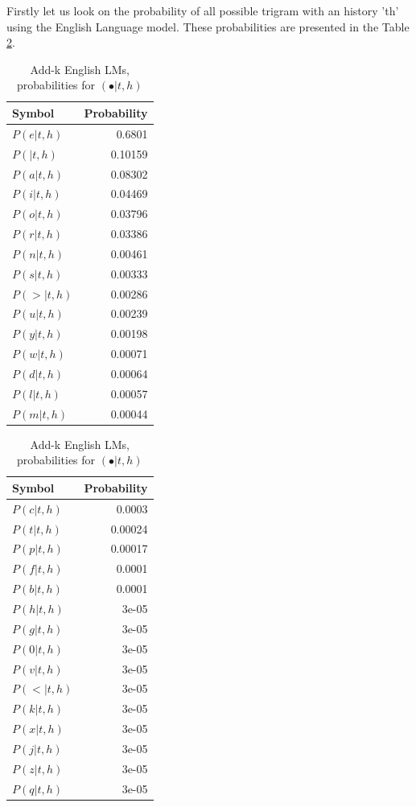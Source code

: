 Firstly let us look on the probability of all possible trigram with an history 'th' using the English Language model. These probabilities are presented in the Table \ref{tab:add-alpha-smoothing}.
\begin{table}[h]
	\centering
	\begin{minipage}{0.48\linewidth}
	\begin{tabular}{lr}
	\toprule
	Symbol & Probability \\
	\midrule
	$P(e|t,h)$ & 0.6801 \\
	$P( |t,h)$ & 0.10159 \\
	$P(a|t,h)$ & 0.08302 \\
	$P(i|t,h)$ & 0.04469 \\
	$P(o|t,h)$ & 0.03796 \\
	$P(r|t,h)$ & 0.03386 \\
	$P(n|t,h)$ & 0.00461 \\
	$P(s|t,h)$ & 0.00333 \\
	$P(>|t,h)$ & 0.00286 \\
	$P(u|t,h)$ & 0.00239 \\
	$P(y|t,h)$ & 0.00198 \\
	$P(w|t,h)$ & 0.00071 \\
	$P(d|t,h)$ & 0.00064 \\
	$P(l|t,h)$ & 0.00057 \\
	$P(m|t,h)$ & 0.00044 \\
	\bottomrule
	\end{tabular}
	\end{minipage}\hfill\begin{minipage}{0.48\linewidth}
	\begin{tabular}{lr}
	\toprule
	Symbol & Probability \\
	\midrule
	$P(c|t,h)$ & 0.0003 \\
	$P(t|t,h)$ & 0.00024 \\
	$P(p|t,h)$ & 0.00017 \\
	$P(f|t,h)$ & 0.0001 \\
	$P(b|t,h)$ & 0.0001 \\
	$P(h|t,h)$ & 3e-05 \\
	$P(g|t,h)$ & 3e-05 \\
	$P(0|t,h)$ & 3e-05 \\
	$P(v|t,h)$ & 3e-05 \\
	$P(<|t,h)$ & 3e-05 \\
	$P(k|t,h)$ & 3e-05 \\
	$P(x|t,h)$ & 3e-05 \\
	$P(j|t,h)$ & 3e-05 \\
	$P(z|t,h)$ & 3e-05 \\
	$P(q|t,h)$ & 3e-05 \\
	\bottomrule
	\end{tabular}
	\end{minipage}

	\vspace*{0.1cm}
	\caption{Add-k English LMs, probabilities for $(\bullet|t, h)$ }
	\label{tab:add-alpha-smoothing}
\end{table}
